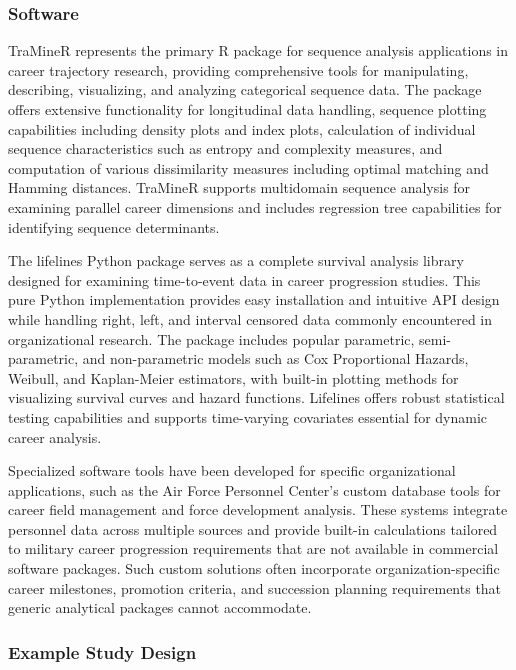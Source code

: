 \documentclass[main.tex]{subfiles}
\begin{document}
\subsubsection{Software}

TraMineR represents the primary R package for sequence analysis applications in career trajectory research, providing comprehensive tools for manipulating, describing, visualizing, and analyzing categorical sequence data. The package offers extensive functionality for longitudinal data handling, sequence plotting capabilities including density plots and index plots, calculation of individual sequence characteristics such as entropy and complexity measures, and computation of various dissimilarity measures including optimal matching and Hamming distances. TraMineR supports multidomain sequence analysis for examining parallel career dimensions and includes regression tree capabilities for identifying sequence determinants\cite{traminer2024}.

The lifelines Python package serves as a complete survival analysis library designed for examining time-to-event data in career progression studies. This pure Python implementation provides easy installation and intuitive API design while handling right, left, and interval censored data commonly encountered in organizational research. The package includes popular parametric, semi-parametric, and non-parametric models such as Cox Proportional Hazards, Weibull, and Kaplan-Meier estimators, with built-in plotting methods for visualizing survival curves and hazard functions. Lifelines offers robust statistical testing capabilities and supports time-varying covariates essential for dynamic career analysis\cite{lifelines2024}.

Specialized software tools have been developed for specific organizational applications, such as the Air Force Personnel Center's custom database tools for career field management and force development analysis. These systems integrate personnel data across multiple sources and provide built-in calculations tailored to military career progression requirements that are not available in commercial software packages. Such custom solutions often incorporate organization-specific career milestones, promotion criteria, and succession planning requirements that generic analytical packages cannot accommodate\cite{afpc2005}.

\subsubsection{Example Study Design}
\end{document}
